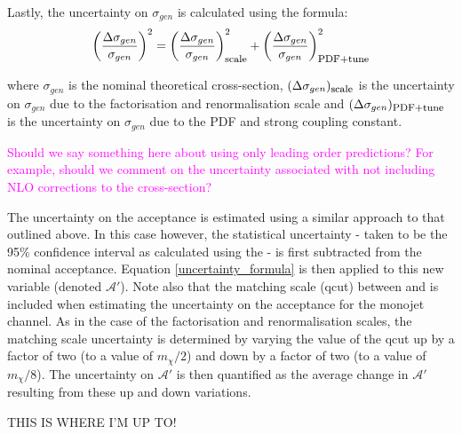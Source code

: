 \begin{flushleft}
Lastly, the uncertainty on $\sigma_{gen}$ is calculated using the formula:
\begin{equation}
\label{uncertainty_formula}
\left(\frac{\Delta \sigma_{gen}}{\sigma_{gen}}\right)^{2} = \left(\frac{\Delta \sigma_{gen}}{\sigma_{gen}}\right)_{\mbox{\footnotesize scale}}^{2} + \left(\frac{\Delta \sigma_{gen}}{\sigma_{gen}}\right)_{\mbox{\footnotesize PDF+tune}}^{2}
\end{equation}

where $\sigma_{gen}$ is the nominal theoretical cross-section, $(\Delta \sigma_{gen})_{\mbox{\footnotesize scale}}$ is the uncertainty on $\sigma_{gen}$ due to the factorisation and renormalisation scale and $(\Delta \sigma_{gen})_{\mbox{\footnotesize PDF+tune}}$ is the uncertainty on $\sigma_{gen}$ due to the PDF and strong coupling constant.
\bigskip

\textcolor{magenta}{Should we say something here about using only leading order predictions? For example, should we comment on the uncertainty associated with not including NLO corrections to the cross-section?} %

\bigskip

The uncertainty on the acceptance is estimated using a similar approach to that outlined above. In this case however, the statistical uncertainty - taken to be the 95\% confidence interval as calculated using the  - is first subtracted from the nominal acceptance. Equation \ref{uncertainty_formula} is then applied to this new variable (denoted $\mathcal{A}'$). Note also that the matching scale (qcut) between \MG and \PYTHIA is included when estimating the uncertainty on the acceptance for the monojet channel. As in the case of the factorisation and renormalisation scales, the matching scale uncertainty is determined by varying the value of the qcut up by a factor of two (to a value of $m_{\chi}/2$) and down by a factor of two (to a value of $m_{\chi}/8$). The uncertainty on $\mathcal{A}'$ is then quantified as the average change in $\mathcal{A}'$ resulting from these up and down variations. 
\bigskip

THIS IS WHERE I'M UP TO!
\end{flushleft}

